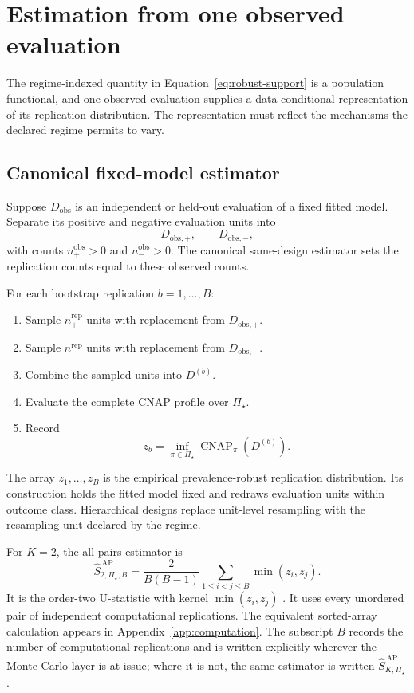 \documentclass[11pt]{article}
\newcommand{\CNAP}{\operatorname{CNAP}}
\newcommand{\PSet}{\Pi_\star}
\newcommand{\SRobHat}{\widehat S_{K,\PSet}^{\,\mathrm{AP}}}
\theoremstyle{remark}
\begin{document}
\section{Estimation from one observed evaluation}
\label{sec:estimation}

The regime-indexed quantity in Equation~\eqref{eq:robust-support} is a population functional, and one observed evaluation supplies a data-conditional representation of its replication distribution. The representation must reflect the mechanisms the declared regime permits to vary.

\subsection{Canonical fixed-model estimator}

Suppose $D_{\mathrm{obs}}$ is an independent or held-out evaluation of a fixed fitted model. Separate its positive and negative evaluation units into
\[
D_{\mathrm{obs},+},
\qquad
D_{\mathrm{obs},-},
\]
with counts $n_+^{\mathrm{obs}}>0$ and $n_-^{\mathrm{obs}}>0$. The canonical same-design estimator sets the replication counts equal to these observed counts.

For each bootstrap replication $b=1,\ldots,B$:
\begin{enumerate}
\item Sample $n_+^{\mathrm{rep}}$ units with replacement from $D_{\mathrm{obs},+}$.
\item Sample $n_-^{\mathrm{rep}}$ units with replacement from $D_{\mathrm{obs},-}$.
\item Combine the sampled units into $D^{(b)}$.
\item Evaluate the complete CNAP profile over $\PSet$.
\item Record
\begin{equation}
z_b
=
\inf_{\pi\in\PSet}
\CNAP_\pi(D^{(b)}).
\label{eq:bootstrap-robust-effect}
\end{equation}
\end{enumerate}

The array $z_1,\ldots,z_B$ is the empirical prevalence-robust replication distribution. Its construction holds the fitted model fixed and redraws evaluation units within outcome class. Hierarchical designs replace unit-level resampling with the resampling unit declared by the regime.

For $K=2$, the all-pairs estimator is
\begin{equation}
\widehat S_{2,\PSet,B}^{\,\mathrm{AP}}
=
\frac{2}{B(B-1)}
\sum_{1\leq i<j\leq B}
\min(z_i,z_j).
\label{eq:all-pairs-estimator}
\end{equation}
It is the order-two U-statistic with kernel $\min(z_i,z_j)$ \cite{hoeffding1948ustat}. It uses every unordered pair of independent computational replications. The equivalent sorted-array calculation appears in Appendix~\ref{app:computation}. The subscript $B$ records the number of computational replications and is written explicitly wherever the Monte Carlo layer is at issue; where it is not, the same estimator is written $\SRobHat$.
\end{document}

